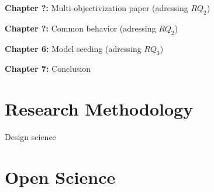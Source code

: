 \textbf{Chapter ?: } Multi-objectivization paper (adressing $RQ_2$)

\textbf{Chapter ?: } Common behavior (adressing $RQ_2$)

\textbf{Chapter 6: } Model seeding (adressing $RQ_3$)

\textbf{Chapter 7: } Conclusion


\section{Research Methodology}

Design science \cite{Hevner2004}

\section{Open Science}













